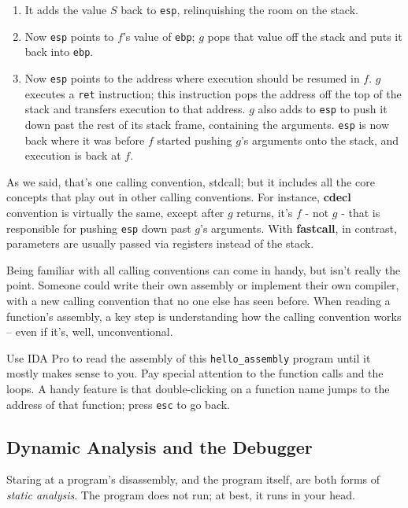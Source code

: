 \documentclass{article}
\newcommand{\xcode}[2]{\colorbox{ubuntuback}{\lstinline[language=#1]|#2|}}
\newcommand{\asm}[1]{\xcode{{[x86masm]assembler}}{#1}}
\newcommand{\code}[1]{\colorbox{ubuntuback}{\texttt{#1}}}
\begin{document}
\begin{enumerate}
        \begin{enumerate}
            \item It adds the value $S$ back to \asm{esp}, relinquishing the room on the stack.
            \item Now \asm{esp} points to $f$'s value of \asm{ebp}; $g$ pops that value off the stack and puts it back into \asm{ebp}.
            \item Now \asm{esp} points to the address where execution should be resumed in $f$. $g$ executes a \asm{ret} instruction; this instruction pops the address off the top of the stack and transfers execution to that address. $g$ also adds to \asm{esp} to push it down past the rest of its stack frame, containing the arguments. \asm{esp} is now back where it was before $f$ started pushing $g$'s arguments onto the stack, and execution is back at $f$.  
        \end{enumerate}
\end{enumerate}

As we said, that's one calling convention, stdcall; but it includes all the core concepts that play out in other calling conventions. For instance, \textbf{cdecl} convention is virtually the same, except after $g$ returns, it's $f$ - not $g$ - that is responsible for pushing \asm{esp} down past $g$'s arguments. With \textbf{fastcall}, in contrast, parameters are usually passed via registers instead of the stack. 

Being familiar with all calling conventions can come in handy, but isn't really the point. Someone could write their own assembly or implement their own compiler, with a new calling convention that no one else has seen before. When reading a function's assembly, a key step is understanding how the calling convention works -- even if it's, well, unconventional.

Use IDA Pro to read the assembly of this \code{hello\_assembly} program until it mostly makes sense to you. Pay special attention to the function calls and the loops. A handy feature is that double-clicking on a function name jumps to the address of that function; press \code{esc} to go back.

\subsection{Dynamic Analysis and the Debugger}

Staring at a program's disassembly, and the program itself, are both forms of \textit{static analysis}. The program does not run; at best, it runs in your head. 
\end{document}
